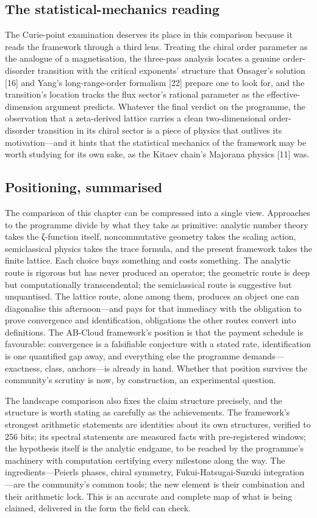 \documentclass[10pt]{article}
\begin{document}
\subsection{The statistical-mechanics reading}\label{sec:133}
The Curie-point examination deserves its place in this comparison because it reads the framework through a third lens. Treating the chiral order parameter as the analogue of a magnetisation, the three-pass analysis locates a genuine order-disorder transition with the critical exponents' structure that Onsager's solution [16] and Yang's long-range-order formalism [22] prepare one to look for, and the transition's location tracks the flux sector's rational parameter as the effective-dimension argument predicts. Whatever the final verdict on the programme, the observation that a zeta-derived lattice carries a clean two-dimensional order-disorder transition in its chiral sector is a piece of physics that outlives its motivation---and it hints that the statistical mechanics of the framework may be worth studying for its own sake, as the Kitaev chain's Majorana physics [11] was.

\subsection{Positioning, summarised}\label{sec:134}
The comparison of this chapter can be compressed into a single view. Approaches to the programme divide by what they take as primitive: analytic number theory takes the ζ-function itself, noncommutative geometry takes the scaling action, semiclassical physics takes the trace formula, and the present framework takes the finite lattice. Each choice buys something and costs something. The analytic route is rigorous but has never produced an operator; the geometric route is deep but computationally transcendental; the semiclassical route is suggestive but unquantised. The lattice route, alone among them, produces an object one can diagonalise this afternoon---and pays for that immediacy with the obligation to prove convergence and identification, obligations the other routes convert into definitions. The AB-Cloud framework's position is that the payment schedule is favourable: convergence is a falsifiable conjecture with a stated rate, identification is one quantified gap away, and everything else the programme demands---exactness, class, anchors---is already in hand. Whether that position survives the community's scrutiny is now, by construction, an experimental question.

The landscape comparison also fixes the claim structure precisely, and the structure is worth stating as carefully as the achievements. The framework's strongest arithmetic statements are identities about its own structures, verified to 256 bits; its spectral statements are measured facts with pre-registered windows; the hypothesis itself is the analytic endgame, to be reached by the programme's machinery with computation certifying every milestone along the way. The ingredients---Peierls phases, chiral symmetry, Fukui-Hatsugai-Suzuki integration---are the community's common tools; the new element is their combination and their arithmetic lock. This is an accurate and complete map of what is being claimed, delivered in the form the field can check.
\end{document}
